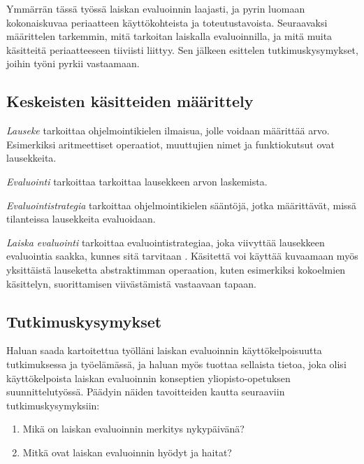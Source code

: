 Ymmärrän tässä työssä laiskan evaluoinnin laajasti, ja pyrin luomaan kokonaiskuvaa periaatteen käyttökohteista ja toteutustavoista.  Seuraavaksi määrittelen tarkemmin, mitä tarkoitan laiskalla evaluoinnilla, ja mitä muita käsitteitä periaatteeseen tiiviisti liittyy. Sen jälkeen esittelen tutkimuskysymykset, joihin työni pyrkii vastaamaan.

\subsection{Keskeisten käsitteiden määrittely}

\textit{Lauseke} tarkoittaa ohjelmointikielen ilmaisua, jolle voidaan määrittää arvo. Esimerkiksi aritmeettiset operaatiot, muuttujien nimet ja funktiokutsut ovat lausekkeita.

\textit{Evaluointi} tarkoittaa tarkoittaa lausekkeen arvon laskemista.

\textit{Evaluointistrategia} tarkoittaa ohjelmointikielen sääntöjä, jotka määrittävät, missä tilanteissa lausekkeita evaluoidaan.

\textit{Laiska evaluointi} tarkoittaa evaluointistrategiaa, joka viivyttää lausekkeen evaluointia saakka, kunnes sitä tarvitaan \citep{watt2004programming}. Käsitettä voi käyttää kuvaamaan myös yksittäistä lauseketta abstraktimman operaation, kuten esimerkiksi kokoelmien käsittelyn, suorittamisen viivästämistä vastaavaan tapaan.

\subsection{Tutkimuskysymykset}


Haluan saada kartoitettua työlläni laiskan evaluoinnin käyttökelpoisuutta tutkimuksessa ja työelämässä, ja haluan myös tuottaa sellaista tietoa, joka olisi käyttökelpoista laiskan evaluoinnin konseptien yliopisto-opetuksen suunnittelutyössä. Päädyin näiden tavoitteiden kautta seuraaviin tutkimuskysymyksiin:
\begin{enumerate}
  \item{Mikä on laiskan evaluoinnin merkitys nykypäivänä?}
  \item{Mitkä ovat laiskan evaluoinnin hyödyt ja haitat?}
\end{enumerate}

